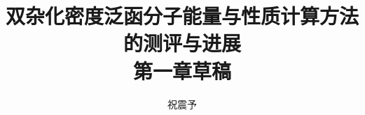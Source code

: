 



\title{\textbf{双杂化密度泛函分子能量与性质计算方法的测评与进展\\第一章草稿}}
\author{祝震予}
\maketitle
\vspace{-10pt}

\tableofcontents


\setcounter{section}{0}



\newpage






